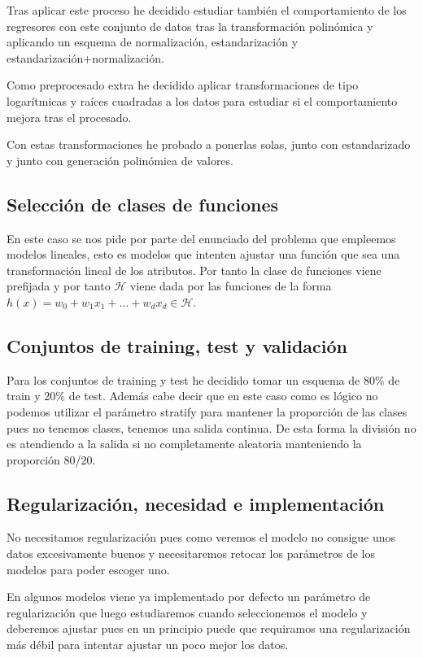 \documentclass[12pt,a4paper]{article}
\begin{document}
Tras aplicar este proceso he decidido estudiar también el comportamiento de los regresores con este conjunto de datos tras la transformación polinómica y aplicando un esquema de normalización, estandarización y estandarización+normalización.

Como preprocesado extra he decidido aplicar transformaciones de tipo logarítmicas y raíces cuadradas a los datos para estudiar si el comportamiento mejora tras el procesado. 

Con estas transformaciones he probado a ponerlas solas, junto con estandarizado y junto con generación polinómica de valores.

\subsection{Selección de clases de funciones}

En este caso se nos pide por parte del enunciado del problema que empleemos modelos lineales, esto es modelos que intenten ajustar una función que sea una transformación lineal de los atributos. Por tanto la clase de funciones viene prefijada y por tanto $\mathcal{H}$ viene dada por las funciones de la forma $h(x) = w_0 + w_1 x_1 + ... + w_d x_d \in \mathcal{H}$.

\subsection{Conjuntos de training, test y validación}

Para los conjuntos de training y test he decidido tomar un esquema de 80\% de train y 20\% de test. Además cabe decir que en este caso como es lógico no podemos utilizar el parámetro stratify para mantener la proporción de las clases pues no tenemos clases, tenemos una salida continua. De esta forma la división no es atendiendo a la salida si no completamente aleatoria manteniendo la proporción 80/20.

\subsection{Regularización, necesidad e implementación}

No necesitamos regularización pues como veremos el modelo no consigue unos datos excesivamente buenos y necesitaremos retocar los parámetros de los modelos para poder escoger uno.

En algunos modelos viene ya implementado por defecto un parámetro de regularización que luego estudiaremos cuando seleccionemos el modelo y deberemos ajustar pues en un principio puede que requiramos una regularización más débil para intentar ajustar un poco mejor los datos.
\end{document}
